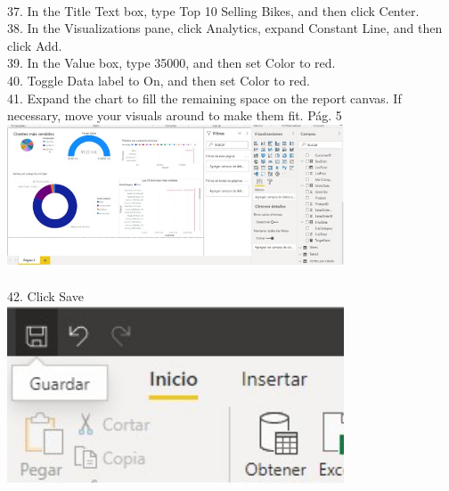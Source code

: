 \documentclass[preprint,12pt]{elsarticle}
\begin{document}
\begin{itemize}
			\\ 37. In the Title Text box, type Top 10 Selling Bikes, and then click Center.
			\\ 38. In the Visualizations pane, click Analytics, expand Constant Line, and then click Add.
			\\ 39. In the Value box, type 35000, and then set Color to red.
			\\ 40. Toggle Data label to On, and then set Color to red.
			\\ 41. Expand the chart to fill the remaining space on the report canvas. If necessary, move your visuals
			around to make them fit.
			Pág. 5
				\\ \includegraphics[width=10cm]{./IMAGENES/4.41} \\
			\\ 42. Click Save
				\\ \includegraphics[width=10cm]{./IMAGENES/4.42} \\
				

\end{itemize}
\end{document}
